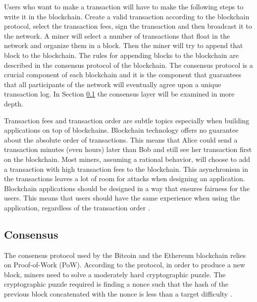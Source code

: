 {{{Users who want to make a transaction will have to make the following steps to write it in the blockchain. Create a valid transaction according to the blockchain protocol, select the transaction fees, sign the transaction and then broadcast it to the network. A miner will select a number of transactions that float in the network and organize them in a block. Then the miner will try to append that block to the blockchain. The rules for appending blocks to the blockchain are described in the consensus protocol of the blockchain. The consensus protocol is a crucial component of each blockchain and it is the component that guarantees that all participants of the network will eventually agree upon a unique transaction log. In Section \ref{sec::BcCons} the consensus layer will be examined in more depth.

Transaction fees and transaction order are subtle topics especially when building applications on top of blockchains. Blockchain technology offers no guarantee about the absolute order of transactions. This means that Alice could send a transaction minutes (even hours) later than Bob and still see her transaction first on the blockchain. Most miners, assuming a rational behavior, will choose to add a transaction with high transaction fees to the blockchain. This asynchronism in the transactions leaves a lot of room for attacks when designing an application. Blockchain applications should be designed in a way that ensures fairness for the users. This means that users should have the same experience when using the application, regardless of the transaction order \cite{Luu:2016:MSC:2976749.2978309}.
}
\subsection{Consensus} \label{sec::BcCons}{

The consensus protocol used by the Bitcoin and the Ethereum blockchain relies on Proof-of-Work (PoW). According to the protocol, in order to produce a new block, miners need to solve a moderately hard cryptographic puzzle. The cryptographic puzzle required is finding a nonce such that the hash of the previous block concatenated with the nonce is less than a target difficulty \cite{nakamoto2008bitcoin}.

}}}
